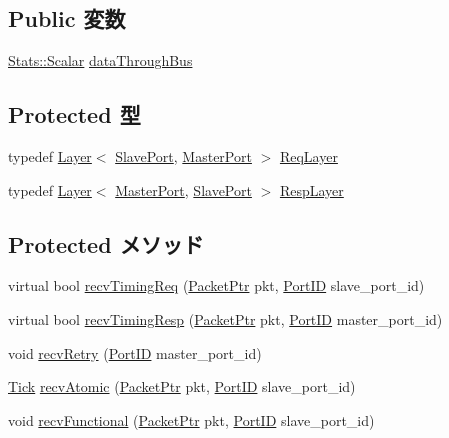 \subsection*{Public 変数}
\begin{DoxyCompactItemize}
\item 
\hyperlink{classStats_1_1Scalar}{Stats::Scalar} \hyperlink{classNoncoherentBus_a7040fa8d9fb24afb9f4fe245b135da19}{dataThroughBus}
\end{DoxyCompactItemize}
\subsection*{Protected 型}
\begin{DoxyCompactItemize}
\item 
typedef \hyperlink{classBaseBus_1_1Layer}{Layer}$<$ \hyperlink{classSlavePort}{SlavePort}, \hyperlink{classMasterPort}{MasterPort} $>$ \hyperlink{classNoncoherentBus_ae15f02c0dca186fbfbd2f7b732e5b441}{ReqLayer}
\item 
typedef \hyperlink{classBaseBus_1_1Layer}{Layer}$<$ \hyperlink{classMasterPort}{MasterPort}, \hyperlink{classSlavePort}{SlavePort} $>$ \hyperlink{classNoncoherentBus_a40797c56ea5eaf481f56dfdc3ab1b399}{RespLayer}
\end{DoxyCompactItemize}
\subsection*{Protected メソッド}
\begin{DoxyCompactItemize}
\item 
virtual bool \hyperlink{classNoncoherentBus_a8e2d7ccc3adb605e763f2bd1c64e5128}{recvTimingReq} (\hyperlink{classPacket}{PacketPtr} pkt, \hyperlink{base_2types_8hh_acef4d7d41cb21fdc252e20c04cd7bb8e}{PortID} slave\_\-port\_\-id)
\item 
virtual bool \hyperlink{classNoncoherentBus_a47ba09f9a3b3998cac9c14ab596a7515}{recvTimingResp} (\hyperlink{classPacket}{PacketPtr} pkt, \hyperlink{base_2types_8hh_acef4d7d41cb21fdc252e20c04cd7bb8e}{PortID} master\_\-port\_\-id)
\item 
void \hyperlink{classNoncoherentBus_a96f9cd33bfb9a8b7fb2b25078eaf75a1}{recvRetry} (\hyperlink{base_2types_8hh_acef4d7d41cb21fdc252e20c04cd7bb8e}{PortID} master\_\-port\_\-id)
\item 
\hyperlink{base_2types_8hh_a5c8ed81b7d238c9083e1037ba6d61643}{Tick} \hyperlink{classNoncoherentBus_ab0e34155d341f5561834eca8e4c97759}{recvAtomic} (\hyperlink{classPacket}{PacketPtr} pkt, \hyperlink{base_2types_8hh_acef4d7d41cb21fdc252e20c04cd7bb8e}{PortID} slave\_\-port\_\-id)
\item 
void \hyperlink{classNoncoherentBus_a5cdfa7d369ba37394403d3c2bd5cf6d1}{recvFunctional} (\hyperlink{classPacket}{PacketPtr} pkt, \hyperlink{base_2types_8hh_acef4d7d41cb21fdc252e20c04cd7bb8e}{PortID} slave\_\-port\_\-id)
\end{DoxyCompactItemize}
